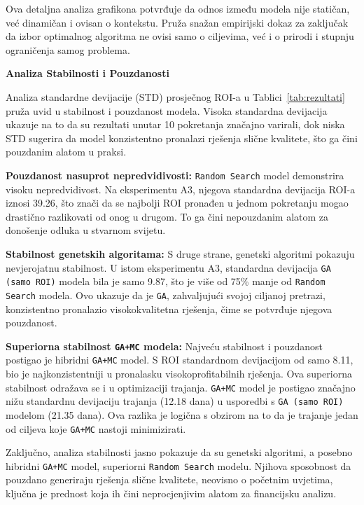 Ova detaljna analiza grafikona potvrđuje da odnos između modela nije statičan, već dinamičan i ovisan o kontekstu. Pruža snažan empirijski dokaz za zaključak da izbor optimalnog algoritma ne ovisi samo o ciljevima, već i o prirodi i stupnju ograničenja samog problema.

\textbf{Analiza Stabilnosti i Pouzdanosti}

Analiza standardne devijacije (STD) prosječnog ROI-a u Tablici~\ref{tab:rezultati} pruža uvid u stabilnost i pouzdanost modela. Visoka standardna devijacija ukazuje na to da su rezultati unutar 10 pokretanja značajno varirali, dok niska STD sugerira da model konzistentno pronalazi rješenja slične kvalitete, što ga čini pouzdanim alatom u praksi.

\textbf{Pouzdanost nasuprot nepredvidivosti:} \texttt{Random Search} model demonstrira visoku nepredvidivost. Na eksperimentu A3, njegova standardna devijacija ROI-a iznosi 39.26, što znači da se najbolji ROI pronađen u jednom pokretanju mogao drastično razlikovati od onog u drugom. To ga čini nepouzdanim alatom za donošenje odluka u stvarnom svijetu.

\textbf{Stabilnost genetskih algoritama:} S druge strane, genetski algoritmi pokazuju nevjerojatnu stabilnost. U istom eksperimentu A3, standardna devijacija \texttt{GA (samo ROI)} modela bila je samo 9.87, što je više od 75\% manje od \texttt{Random Search} modela. Ovo ukazuje da je \texttt{GA}, zahvaljujući svojoj ciljanoj pretrazi, konzistentno pronalazio visokokvalitetna rješenja, čime se potvrđuje njegova pouzdanost.

\textbf{Superiorna stabilnost \texttt{GA+MC} modela:} Najveću stabilnost i pouzdanost postigao je hibridni \texttt{GA+MC} model. S ROI standardnom devijacijom od samo 8.11, bio je najkonzistentniji u pronalasku visokoprofitabilnih rješenja. Ova superiorna stabilnost odražava se i u optimizaciji trajanja. \texttt{GA+MC} model je postigao značajno nižu standardnu devijaciju trajanja (12.18 dana) u usporedbi s \texttt{GA (samo ROI)} modelom (21.35 dana). Ova razlika je logična s obzirom na to da je trajanje jedan od ciljeva koje \texttt{GA+MC} nastoji minimizirati.

Zaključno, analiza stabilnosti jasno pokazuje da su genetski algoritmi, a posebno hibridni \texttt{GA+MC} model, superiorni \texttt{Random Search} modelu. Njihova sposobnost da pouzdano generiraju rješenja slične kvalitete, neovisno o početnim uvjetima, ključna je prednost koja ih čini neprocjenjivim alatom za financijsku analizu.

